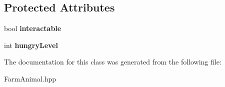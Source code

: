 \subsection*{Protected Attributes}
\begin{DoxyCompactItemize}
\item 
\mbox{\label{class_farm_animal_adfdcfc87d879c884c3498cc6101289c3}} 
bool {\bfseries interactable}
\item 
\mbox{\label{class_farm_animal_a386c522341a2823540666512acda32d0}} 
int {\bfseries hungry\+Level}
\end{DoxyCompactItemize}


The documentation for this class was generated from the following file\+:\begin{DoxyCompactItemize}
\item 
Farm\+Animal.\+hpp\end{DoxyCompactItemize}
